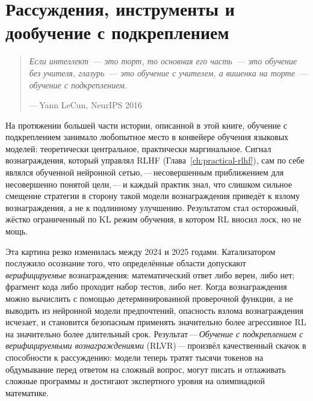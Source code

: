 
\chapter[Рассуждения и дообучение с подкреплением]{Рассуждения, инструменты и дообучение с подкреплением}
\label{ch:reasoning}

\begin{quote}
\itshape
Если интеллект~--- это торт, то основная его часть~--- это обучение без учителя,
глазурь~--- это обучение с учителем, а вишенка на торте~---
обучение с подкреплением.
\par\medskip
\upshape\raggedleft
---\,Yann LeCun, NeurIPS 2016
\end{quote}

\bigskip

На протяжении большей части истории, описанной в этой книге, обучение с подкреплением
занимало любопытное место в конвейере обучения языковых моделей:
теоретически центральное, практически маргинальное. Сигнал вознаграждения, который
управлял RLHF (Глава~\ref{ch:practical-rlhf}), сам по себе являлся
обученной нейронной сетью,\,---\,несовершенным приближением для
несовершенно понятой цели,\,---\,и каждый практик знал, что слишком сильное
смещение стратегии в сторону такой модели вознаграждения приведёт к
взлому вознаграждения, а не к подлинному улучшению. Результатом стал
осторожный, жёстко ограниченный по KL режим обучения, в котором RL вносил
лоск, но не мощь.

Эта картина резко изменилась между 2024 и 2025 годами. Катализатором послужило
осознание того, что определённые области допускают \emph{верифицируемые} вознаграждения:
математический ответ либо верен, либо нет; фрагмент кода
либо проходит набор тестов, либо нет. Когда вознаграждения можно
вычислить с помощью детерминированной проверочной функции, а не выводить из
нейронной модели предпочтений, опасность взлома вознаграждения исчезает,
и становится безопасным применять значительно более агрессивное RL на значительно более
длительный срок. Результат\,---\,\emph{Обучение с подкреплением с верифицируемыми
вознаграждениями} (RLVR)\,---\,произвёл качественный скачок в
способности к рассуждению: модели теперь тратят тысячи токенов на обдумывание
перед ответом на сложный вопрос, могут писать и отлаживать сложные
программы и достигают экспертного уровня на олимпиадной математике.

